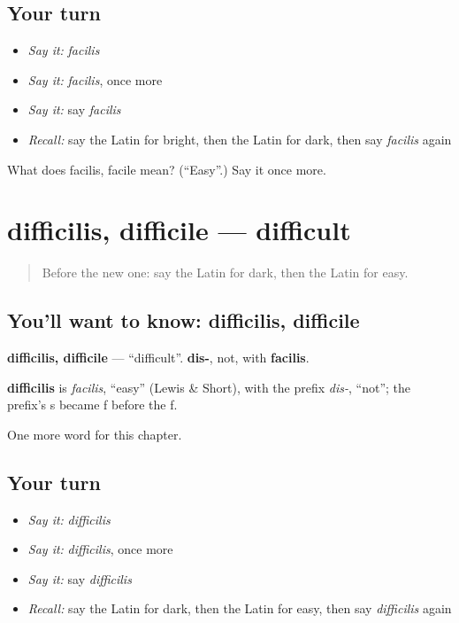 \subsection*{Your turn}
\begin{itemize}
\raggedright
  \item \emph{Say it:} \emph{facilis}
  \item \emph{Say it:} \emph{facilis}, once more
  \item \emph{Say it:} say \emph{facilis}
  \item \emph{Recall:} say the Latin for bright, then the Latin for dark, then say \emph{facilis} again
\end{itemize}

\begin{tcolorbox}[breakable,colback=teal!4,colframe=teal!35!black,title={Before you move on}]
What does facilis, facile mean? (\textquotedblleft{}Easy\textquotedblright{}.) Say it once more.
\end{tcolorbox}
\section[difficilis, difficile]{difficilis, difficile — difficult}

\label{lesson:LA-C97-difficilis}



\begin{quote}
Before the new one: say the Latin for dark, then the Latin for easy.
\end{quote}

\subsection*{You'll want to know: difficilis, difficile}
\textbf{difficilis, difficile} — \textquotedblleft{}difficult\textquotedblright{}. \textbf{dis-}, not, with \textbf{facilis}.

\begin{cousinweb}
\textbf{difficilis} is \emph{facilis}, \textquotedblleft{}easy\textquotedblright{} (Lewis \& Short), with the prefix \emph{dis-}, \textquotedblleft{}not\textquotedblright{}; the prefix's s became f before the f.
\end{cousinweb}

\begin{grammarlens}[title={What you've built}]
One more word for this chapter.
\end{grammarlens}

\subsection*{Your turn}
\begin{itemize}
\raggedright
  \item \emph{Say it:} \emph{difficilis}
  \item \emph{Say it:} \emph{difficilis}, once more
  \item \emph{Say it:} say \emph{difficilis}
  \item \emph{Recall:} say the Latin for dark, then the Latin for easy, then say \emph{difficilis} again
\end{itemize}

